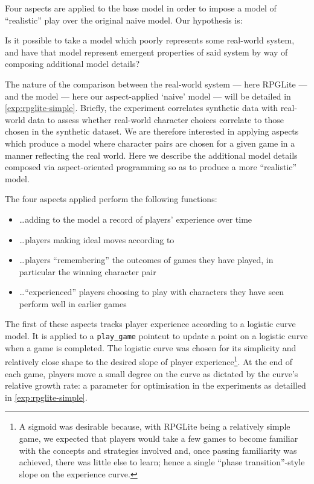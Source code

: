 Four aspects are applied to the base model in order to impose a model of
``realistic'' play over the original naive model. Our hypothesis is:

\begin{displayquote}
  Is it possible to take a model which poorly represents some real-world system,
  and have that model represent emergent properties of said system by way of
  composing additional model details?
\end{displayquote}

The nature of the comparison between the real-world system --- here RPGLite ---
and the model --- here our aspect-applied `naive' model --- will be detailed in
\cref{exp:rpglite-simple}. Briefly, the experiment correlates synthetic data
with real-world data to assess whether real-world character choices correlate to
those chosen in the synthetic dataset. We are therefore interested in applying
aspects which produce a model where character pairs are chosen for a given game
in a manner reflecting the real world. Here we describe the additional model
details composed via aspect-oriented programming so as to produce a more
``realistic'' model.
\par

The four aspects applied perform the following functions:

\begin{itemize}
\item \ldots{}adding to the model a record of players' experience over time
  \item \ldots{}players making ideal moves according to
    \cite{kavanagh2020}
  \item \ldots{}players ``remembering'' the outcomes of games they have played,
    in particular the winning character pair
    \item \ldots{}``experienced'' players choosing to play with characters they
      have seen perform well in earlier games
\end{itemize}

The first of these aspects tracks player experience according to a logistic
curve model. It is applied to a \lstinline{play_game} pointcut to update a point on a
logistic curve when a game is completed. The logistic curve was chosen for its
simplicity and relatively close shape to the desired slope of player
experience\footnote{A sigmoid was desirable because, with RPGLite being a
  relatively simple game, we expected that players would take a few games to
  become familiar with the concepts and strategies involved and, once passing
  familiarity was achieved, there was little else to learn; hence a single
  ``phase transition''-style slope on the experience curve.}. At the end of each
game, players move a small degree on the curve as dictated by the curve's
relative growth rate: a parameter for optimisation in the experiments as
detailled in \cref{exp:rpglite-simple}.
\par

